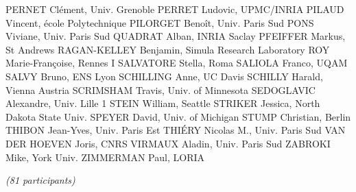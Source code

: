 \documentclass[12pt]{amsart}
\begin{document}
PERNET Clément, Univ. Grenoble
PERRET Ludovic, UPMC/INRIA
PILAUD Vincent, école Polytechnique
PILORGET Benoît, Univ. Paris Sud
PONS Viviane, Univ. Paris Sud
QUADRAT Alban, INRIA Saclay
PFEIFFER Markus, St Andrews
RAGAN-KELLEY Benjamin, Simula Research Laboratory
ROY Marie-Françoise, Rennes I
SALVATORE Stella, Roma
SALIOLA Franco, UQAM
SALVY Bruno, ENS Lyon
SCHILLING Anne, UC Davis
SCHILLY Harald, Vienna Austria
SCRIMSHAM Travis, Univ. of Minnesota
SEDOGLAVIC Alexandre, Univ. Lille 1
STEIN William, Seattle
STRIKER Jessica, North Dakota State Univ.
SPEYER David, Univ. of Michigan
STUMP Christian, Berlin
THIBON Jean-Yves, Univ. Paris Est
THIÉRY Nicolas M., Univ. Paris Sud
VAN DER HOEVEN Joris, CNRS
VIRMAUX Aladin, Univ. Paris Sud
ZABROKI Mike, York Univ.
ZIMMERMAN Paul, LORIA

\medskip
\emph{(81 participants)}
\end{document}
